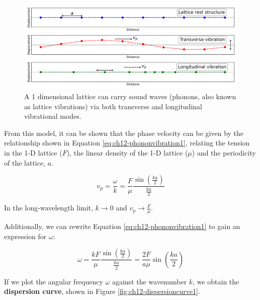 \documentclass[
]{book}
\begin{document}
\begin{figure}

{\centering \includegraphics[width=0.7\linewidth]{visualisations/ch12-phonons1} 

}

\caption{A 1 dimensional lattice can carry sound waves (phonons, also known as lattice vibrations) via both transverse and longitudinal vibrational modes. }\label{fig:ch12-phononvibration1}
\end{figure}

From this model, it can be shown that the phase velocity can be given by the relationship shown in Equation \eqref{eq:ch12-phononvibration1}, relating the tension in the 1-D lattice (\(F\)), the linear density of the 1-D lattice (\(\mu\)) and the periodicity of the lattice, \(a\).

\begin{equation}
v_{p} = \frac{\omega}{k} = \frac{F}{\mu}\frac{\sin \left(\frac{ka}{2}\right)}{\frac{ka}{2}}
\label{eq:ch12-phononvibration1}
\end{equation}

In the long-wavelength limit, \(k \rightarrow 0\) and \(v_p \rightarrow \frac{F}{\mu}\).

Additionally, we can rewrite Equation \eqref{eq:ch12-phononvibration1} to gain an expression for \(\omega\):

\begin{equation}
\omega = \frac{kF}{\mu}\frac{\sin \left(\frac{ka}{2}\right)}{\frac{ka}{2}} = \frac{2F}{a\mu}\sin \left(\frac{ka}{2}\right)
\label{eq:ch12-phononvibration2}
\end{equation}

If we plot the angular frequency \(\omega\) against the wavenumber \(k\), we obtain the \textbf{dispersion curve}, shown in Figure \ref{fig:ch12-dispersioncurve1}.
\end{document}
